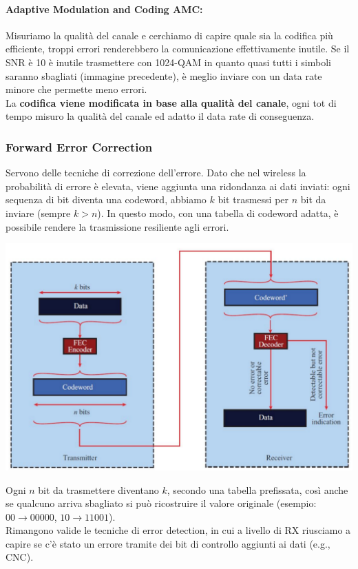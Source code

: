 \newpage

\paragraph{Adaptive Modulation and Coding AMC:} Misuriamo la qualità del canale e cerchiamo di capire quale sia la codifica più efficiente, troppi errori renderebbero la comunicazione effettivamente inutile. Se il SNR è 10 è inutile trasmettere con 1024-QAM in quanto quasi tutti i simboli saranno sbagliati (immagine precedente), è meglio inviare con un data rate minore che permette meno errori. \\

La \textbf{codifica viene modificata in base alla qualità del canale}, ogni tot di tempo misuro la qualità del canale ed adatto il data rate di conseguenza.\\

\subsubsection{Forward Error Correction}
Servono delle tecniche di correzione dell'errore. Dato che nel wireless la probabilità di errore è elevata, viene aggiunta una ridondanza ai dati inviati: ogni sequenza di bit diventa una codeword, abbiamo $k$ bit trasmessi per $n$ bit da inviare (sempre $k>n$). In questo modo, con una tabella di codeword adatta, è possibile rendere la trasmissione resiliente agli errori.
\begin{center}
	\includegraphics[width=0.7\linewidth]{img/wireless/FEC1}
\end{center}
Ogni $n$ bit da trasmettere diventano $k$, secondo una tabella prefissata, così anche se qualcuno arriva sbagliato si può ricostruire il valore originale (esempio: $00 \rightarrow 00000$, $10 \rightarrow 11001$).\\
Rimangono valide le tecniche di error detection, in cui a livello di RX riusciamo a capire se c'è stato un errore tramite dei bit di controllo aggiunti ai dati (e.g., CNC).\\

